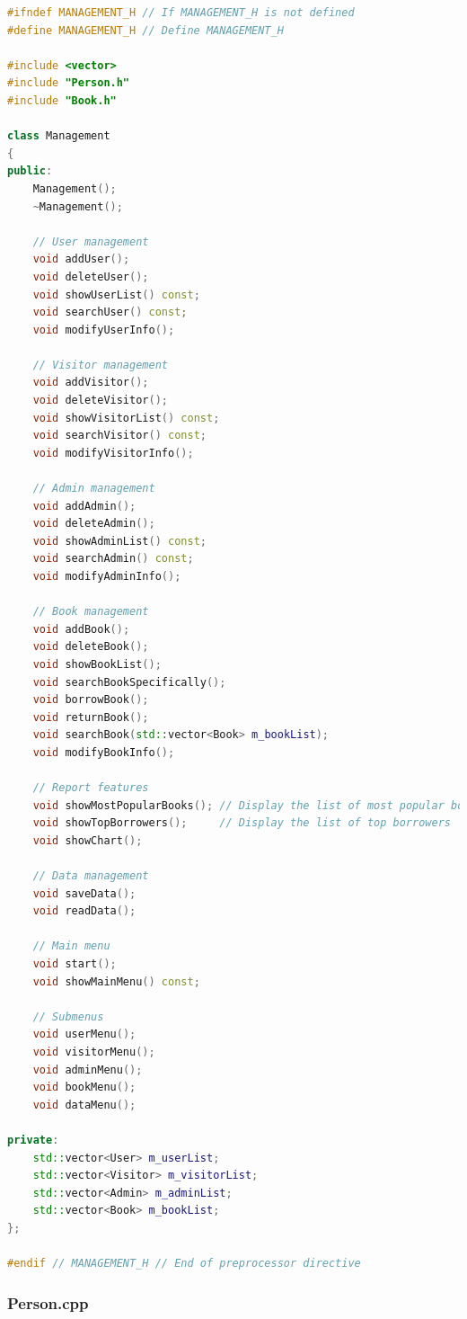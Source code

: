\documentclass[12pt,twoside]{ctexart}
\begin{document}
\begin{lstlisting}[language=C++]
#ifndef MANAGEMENT_H // If MANAGEMENT_H is not defined
#define MANAGEMENT_H // Define MANAGEMENT_H

#include <vector>
#include "Person.h"
#include "Book.h"

class Management
{
public:
    Management();
    ~Management();

    // User management
    void addUser();
    void deleteUser();
    void showUserList() const;
    void searchUser() const;
    void modifyUserInfo();

    // Visitor management
    void addVisitor();
    void deleteVisitor();
    void showVisitorList() const;
    void searchVisitor() const;
    void modifyVisitorInfo();

    // Admin management
    void addAdmin();
    void deleteAdmin();
    void showAdminList() const;
    void searchAdmin() const;
    void modifyAdminInfo();

    // Book management
    void addBook();
    void deleteBook();
    void showBookList();
    void searchBookSpecifically();
    void borrowBook();
    void returnBook();
    void searchBook(std::vector<Book> m_bookList);
    void modifyBookInfo();

    // Report features
    void showMostPopularBooks(); // Display the list of most popular books
    void showTopBorrowers();     // Display the list of top borrowers
    void showChart();

    // Data management
    void saveData();
    void readData();

    // Main menu
    void start();
    void showMainMenu() const;

    // Submenus
    void userMenu();
    void visitorMenu();
    void adminMenu();
    void bookMenu();
    void dataMenu();

private:
    std::vector<User> m_userList;
    std::vector<Visitor> m_visitorList;
    std::vector<Admin> m_adminList;
    std::vector<Book> m_bookList;
};

#endif // MANAGEMENT_H // End of preprocessor directive
\end{lstlisting}

\newpage
\subsubsection{Person.cpp}
\end{document}
